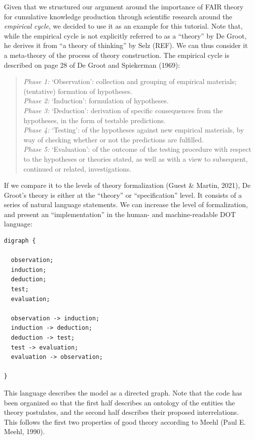 \documentclass[
  man,floatsintext]{apa6}
\begin{document}
Given that we structured our argument around the importance of FAIR theory for cumulative knowledge production through scientific research around the \emph{empirical cycle},
we decided to use it as an example for this tutorial.
Note that, while the empirical cycle is not explicitly referred to as a ``theory'' by De Groot, he derives it from ``a theory of thinking'' by Selz (REF).
We can thus consider it a meta-theory of the process of theory construction.
The empirical cycle is described on page 28 of De Groot and Spiekerman (1969):

\begin{quote}
\emph{Phase 1:} `Observation': collection and grouping of empirical materials; (tentative) formation of hypotheses.\\
\emph{Phase 2:} `Induction': formulation of hypotheses.\\
\emph{Phase 3:} `Deduction': derivation of specific consequences from the hypotheses, in the form of testable predictions.\\
\emph{Phase 4:} `Testing': of the hypotheses against new empirical materials, by way of checking whether or not the predictions are fulfilled.\\
\emph{Phase 5:} `Evaluation': of the outcome of the testing procedure with respect to the hypotheses or theories stated, as well as with a view to subsequent, continued or related, investigations.
\end{quote}

If we compare it to the levels of theory formalization (Guest \& Martin, 2021),
De Groot's theory is either at the ``theory'' or ``specification'' level.
It consists of a series of natural language statements.
We can increase the level of formalization, and present an ``implementation'' in the human- and machine-readable DOT language:

\begin{verbatim}
digraph {

  observation;
  induction;
  deduction;
  test;
  evaluation;
  
  observation -> induction;
  induction -> deduction;
  deduction -> test;
  test -> evaluation;
  evaluation -> observation;
  
}
\end{verbatim}

This language describes the model as a directed graph.
Note that the code has been organized so that the first half describes an ontology of the entities the theory postulates,
and the second half describes their proposed interrelations.
This follows the first two properties of good theory according to Meehl (Paul E. Meehl, 1990).
\end{document}
